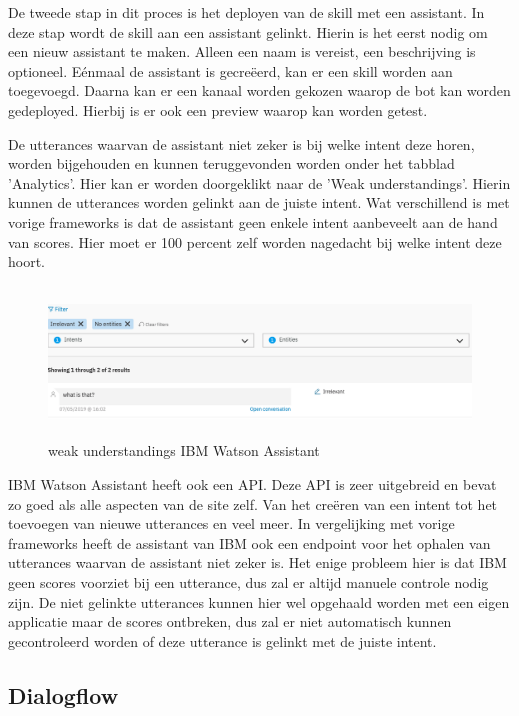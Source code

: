 De tweede stap in dit proces is het deployen van de skill met een assistant. In deze stap wordt de skill aan een assistant gelinkt. Hierin is het eerst nodig om een nieuw assistant te maken. Alleen een naam is vereist, een beschrijving is optioneel. Eénmaal de assistant is gecreëerd, kan er een skill worden aan toegevoegd. Daarna kan er een kanaal worden gekozen waarop de bot kan worden gedeployed. Hierbij is er ook een preview waarop kan worden getest.

De utterances waarvan de assistant niet zeker is bij welke intent deze horen, worden bijgehouden en kunnen teruggevonden worden onder het tabblad 'Analytics'. Hier kan er worden doorgeklikt naar de 'Weak understandings'. Hierin kunnen de utterances worden gelinkt aan de juiste intent. Wat verschillend is met vorige frameworks is dat de assistant geen enkele intent aanbeveelt aan de hand van scores. Hier moet er 100 percent zelf worden nagedacht bij welke intent deze hoort.

\begin{figure}[h!]
	\centering
	\includegraphics[height=4cm]{img/weak.png}
	\caption{weak understandings IBM Watson Assistant}
	\label{fig:weak}
\end{figure}

IBM Watson Assistant heeft ook een API. Deze API is zeer uitgebreid en bevat zo goed als alle aspecten van de site zelf. Van het creëren van een intent tot het toevoegen van nieuwe utterances en veel meer. In vergelijking met vorige frameworks heeft de assistant van IBM ook een endpoint voor het ophalen van utterances waarvan de assistant niet zeker is. Het enige probleem hier is dat IBM geen scores voorziet bij een utterance, dus zal er altijd manuele controle nodig zijn. De niet gelinkte utterances kunnen hier wel opgehaald worden met een eigen applicatie maar de scores ontbreken, dus zal er niet automatisch kunnen gecontroleerd worden of deze utterance is gelinkt met de juiste intent.

\subsection{Dialogflow}
\label{dialogflow}

